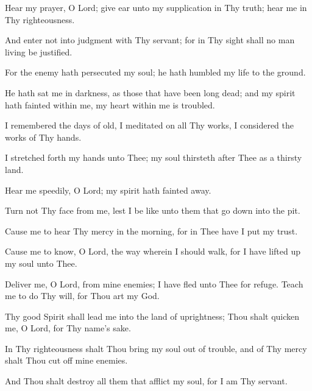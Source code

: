 Hear my prayer, O Lord; give ear unto my supplication in Thy truth; hear me in Thy righteousness.

And enter not into judgment with Thy servant; for in Thy sight shall no man living be justified.

For the enemy hath persecuted my soul; he hath humbled my life to the ground.

He hath sat me in darkness, as those that have been long dead; and my spirit hath fainted within me, my heart within me is troubled.

I remembered the days of old, I meditated on all Thy works, I considered the works of Thy hands.

I stretched forth my hands unto Thee; my soul thirsteth after Thee as a thirsty land.

Hear me speedily, O Lord; my spirit hath fainted away.

Turn not Thy face from me, lest I be like unto them that go down into the pit.

Cause me to hear Thy mercy in the morning, for in Thee have I put my trust.

Cause me to know, O Lord, the way wherein I should walk, for I have lifted up my soul unto Thee.

Deliver me, O Lord, from mine enemies; I have fled unto Thee for refuge. Teach me to do Thy will, for Thou art my God.

Thy good Spirit shall lead me into the land of uprightness; Thou shalt quicken me, O Lord, for Thy name’s sake.

In Thy righteousness shalt Thou bring my soul out of trouble, and of Thy mercy shalt Thou cut off mine enemies.

And Thou shalt destroy all them that afflict my soul, for I am Thy servant.
